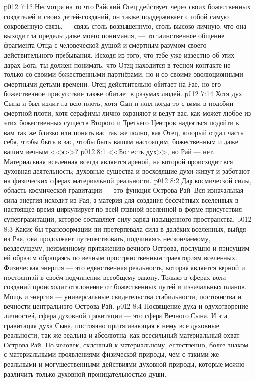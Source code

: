 \vs p012 7:13 \pc Несмотря на то что Райский Отец действует через своих божественных создателей и своих детей\hyp{}созданий, он также поддерживает с тобой самую сокровенную связь, --- связь столь возвышенную, столь высоко личную, что она выходит за пределы даже моего понимания, --- то таинственное общение фрагмента Отца с человеческой душой и смертным разумом своего действительного пребывания. Исходя из того, что тебе уже известно об этих дарах Бога, ты должен понимать, что Отец находится в тесном контакте не только со своими божественными партнёрами, но и со своими эволюционными смертными детьми времени. Отец действительно обитает на Рае, но его божественное присутствие также обитает в разумах людей.
\vs p012 7:14 Хотя дух Сына и был излит на всю плоть, хотя Сын и жил когда\hyp{}то с вами в подобии смертной плоти, хотя серафимы лично охраняют и ведут вас, как может любое из этих божественных существ Второго и Третьего Центров надеяться подойти к вам так же близко или понять вас так же полно, как Отец, который отдал часть себя, чтобы быть в вас, чтобы быть вашим настоящим, божественным и даже вашим вечным <<я>>?
\vs p012 8:1 <<Бог есть дух>>, но Рай --- нет. Материальная вселенная всегда является ареной, на которой происходит вся духовная деятельность; духовные существа и восходящие духи живут и работают на физических сферах материальной реальности.
\vs p012 8:2 \pc Дар космической силы, область космической гравитации --- это функция Острова Рай. Вся изначальная сила\hyp{}энергия исходит из Рая, а материя для создания бессчётных вселенных в настоящее время циркулирует по всей главной вселенной в форме присутствия супергравитации, которое составляет силу\hyp{}заряд насыщенного пространства.
\vs p012 8:3 Какие бы трансформации ни претерпевала сила в далёких вселенных, выйдя из Рая, она продолжает путешествовать, подчиняясь нескончаемому, вездесущему, неизменному притяжению вечного Острова, послушно и присущим ей образом обращаясь по вечным пространственным траекториям вселенных. Физическая энергия --- это единственная реальность, которая является верной и постоянной в своём подчинении всеобщему закону. Только в сферах воли созданий происходит отклонение от божественных путей и изначальных планов. Мощь и энергия --- универсальные свидетельства стабильности, постоянства и вечности центрального Острова Рай.
\vs p012 8:4 \pc Посвящение духа и одухотворение личностей, сфера духовной гравитации --- это сфера Вечного Сына. И эта гравитация духа Сына, постоянно притягивающая к нему все духовные реальности, так же реальна и абсолютна, как всесильный материальный охват Острова Рай. Но человек, склонный к материальному, естественно, более знаком с материальными проявлениями физической природы, чем с такими же реальными и могущественными действиями духовной природы, которые можно различить только духовной проницательностью души.
